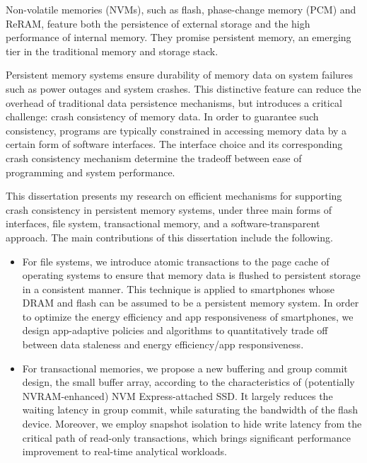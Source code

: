 \begin{eabstract}

Non-volatile memories (NVMs), such as flash, phase-change memory (PCM) and
ReRAM, feature both the persistence of external storage and the high
performance of internal memory. They promise persistent memory, an emerging
tier in the traditional memory and storage stack.

Persistent memory systems ensure durability of memory data on system failures
such as power outages and system crashes. This distinctive feature can reduce
the overhead of traditional data persistence mechanisms, but introduces a
critical challenge: crash consistency of memory data. In order to guarantee
such consistency, programs are typically constrained in accessing memory data
by a certain form of software interfaces. The interface choice and its
corresponding crash consistency mechanism determine the tradeoff between ease
of programming and system performance.

This dissertation presents my research on efficient mechanisms for supporting
crash consistency in persistent memory systems, under three main forms of
interfaces, file system, transactional memory, and a software-transparent
approach.  The main contributions of this dissertation include the following.

\begin{itemize}
\item For file systems, we introduce atomic transactions to the page cache of
operating systems to ensure that memory data is flushed to persistent storage
in a consistent manner. This technique is applied to smartphones whose DRAM and
flash can be assumed to be a persistent memory system. In order to optimize the
energy efficiency and app responsiveness of smartphones, we design app-adaptive
policies and algorithms to quantitatively trade off between data staleness and
energy efficiency/app responsiveness.

\item For transactional memories, we propose a new buffering and group commit design, the small buffer array, according to the characteristics of (potentially NVRAM-enhanced) NVM Express-attached SSD. It largely reduces the waiting latency in group commit, while saturating the bandwidth of the flash device. Moreover, we employ snapshot isolation to hide write latency from the critical path of read-only transactions, which brings significant performance improvement to real-time analytical workloads.


\end{itemize}
\end{eabstract}
